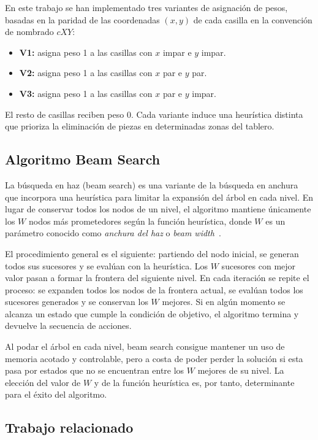 \documentclass[conference,a4paper]{IEEEtran}
\begin{document}
En este trabajo se han implementado tres variantes de asignación de pesos,
basadas en la paridad de las coordenadas $(x, y)$ de cada casilla en la
convención de nombrado $cXY$:
\begin{itemize}
  \item \textbf{V1:} asigna peso 1 a las casillas con $x$ impar e $y$ impar.
  \item \textbf{V2:} asigna peso 1 a las casillas con $x$ par e $y$ par.
  \item \textbf{V3:} asigna peso 1 a las casillas con $x$ par e $y$ impar.
\end{itemize}
El resto de casillas reciben peso 0. Cada variante induce una heurística
distinta que prioriza la eliminación de piezas en determinadas zonas del
tablero.

\subsection{Algoritmo Beam Search}

La búsqueda en haz (beam search) es una variante de la búsqueda en anchura
que incorpora una heurística para limitar la expansión del árbol en cada nivel.
En lugar de conservar todos los nodos de un nivel, el algoritmo mantiene
únicamente los $W$ nodos más prometedores según la función heurística, donde
$W$ es un parámetro conocido como \textit{anchura del haz} o
\textit{beam width}~\cite{russell-norvig}.

El procedimiento general es el siguiente: partiendo del nodo inicial, se
generan todos sus sucesores y se evalúan con la heurística. Los $W$ sucesores
con mejor valor pasan a formar la frontera del siguiente nivel. En cada
iteración se repite el proceso: se expanden todos los nodos de la frontera
actual, se evalúan todos los sucesores generados y se conservan los $W$
mejores. Si en algún momento se alcanza un estado que cumple la condición de
objetivo, el algoritmo termina y devuelve la secuencia de acciones.

Al podar el árbol en cada nivel, beam search consigue mantener un uso de
memoria acotado y controlable, pero a costa de poder perder la solución si
esta pasa por estados que no se encuentran entre los $W$ mejores de su nivel.
La elección del valor de $W$ y de la función heurística es, por tanto,
determinante para el éxito del algoritmo.

\subsection{Trabajo relacionado}
\end{document}
